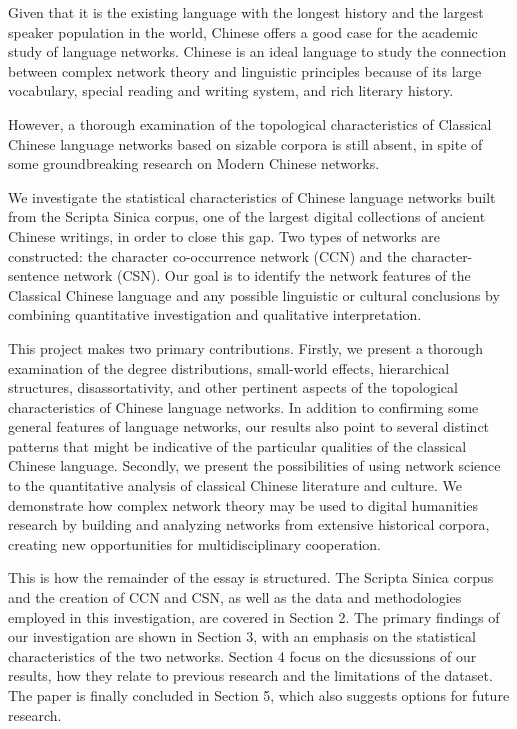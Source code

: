 \documentclass[11pt]{article}
\begin{document}
Given that it is the existing language with the longest history and the largest speaker population in the world, Chinese offers a good case for the academic study of language networks. Chinese is an ideal language to study the connection between complex network theory and linguistic principles because of its large vocabulary, special reading and writing system, and rich literary history.

However, a thorough examination of the topological characteristics of Classical Chinese language networks based on sizable corpora is still absent, in spite of some groundbreaking research on Modern Chinese networks\cite{LI2007629}.

We investigate the statistical characteristics of Chinese language networks built from the Scripta Sinica corpus, one of the largest digital collections of ancient Chinese writings, in order to close this gap. Two types of networks are constructed: the character co-occurrence network (CCN) and the character-sentence network (CSN). Our goal is to identify the network features of the Classical Chinese language and any possible linguistic or cultural conclusions by combining quantitative investigation and qualitative interpretation.

This project makes two primary contributions. Firstly, we present a thorough examination of the degree distributions, small-world effects, hierarchical structures, disassortativity, and other pertinent aspects of the topological characteristics of Chinese language networks. In addition to confirming some general features of language networks, our results also point to several distinct patterns that might be indicative of the particular qualities of the classical Chinese language. Secondly, we present the possibilities of using network science to the quantitative analysis of classical Chinese literature and culture. We demonstrate how complex network theory may be used to digital humanities research by building and analyzing networks from extensive historical corpora, creating new opportunities for multidisciplinary cooperation.

This is how the remainder of the essay is structured. The Scripta Sinica corpus and the creation of CCN and CSN, as well as the data and methodologies employed in this investigation, are covered in Section 2. The primary findings of our investigation are shown in Section 3, with an emphasis on the statistical characteristics of the two networks. Section 4 focus on the dicsussions of our results, how they relate to previous research and the limitations of the dataset. The paper is finally concluded in Section 5, which also suggests options for future research.
\end{document}
